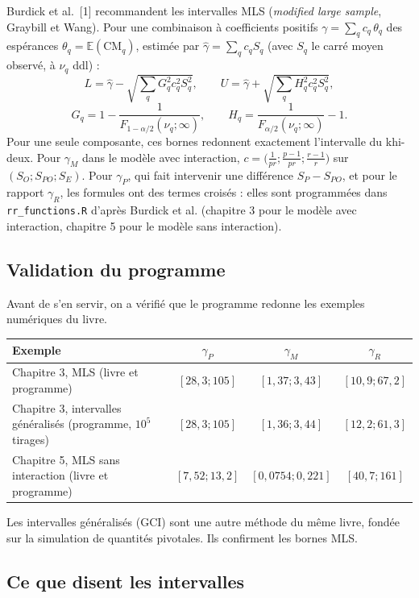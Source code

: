 \documentclass[11pt,a4paper]{article}
\theoremstyle{sj}
\theoremstyle{definition}
\theoremstyle{remark}
\newcommand{\E}{\mathbb{E}}
\newcommand{\CM}{\mathrm{CM}}
\newcommand{\gP}{\gamma_P}
\newcommand{\gM}{\gamma_M}
\newcommand{\gR}{\gamma_R}
\begin{document}
Burdick et al.~[1] recommandent les intervalles MLS (\emph{modified large sample}, Graybill et Wang). Pour une combinaison à coefficients positifs $\gamma=\sum_q c_q\,\theta_q$ des espérances $\theta_q=\E(\CM_q)$, estimée par $\hat\gamma=\sum_qc_qS_q$ (avec $S_q$ le carré moyen observé, à $\nu_q$ ddl) :
\[
L=\hat\gamma-\sqrt{\textstyle\sum_q G_q^2c_q^2S_q^2},\qquad U=\hat\gamma+\sqrt{\textstyle\sum_q H_q^2c_q^2S_q^2},
\]
\[
G_q=1-\frac{1}{F_{1-\alpha/2}(\nu_q;\infty)},\qquad H_q=\frac{1}{F_{\alpha/2}(\nu_q;\infty)}-1.
\]
Pour une seule composante, ces bornes redonnent exactement l'intervalle du khi-deux. Pour $\gM$ dans le modèle avec interaction, $c=\big(\tfrac{1}{pr};\tfrac{p-1}{pr};\tfrac{r-1}{r}\big)$ sur $(S_O;S_{PO};S_E)$. Pour $\gP$, qui fait intervenir une différence $S_P-S_{PO}$, et pour le rapport $\gR$, les formules ont des termes croisés : elles sont programmées dans \texttt{rr\_functions.R} d'après Burdick et al. (chapitre 3 pour le modèle avec interaction, chapitre 5 pour le modèle sans interaction).

\subsection{Validation du programme}

Avant de s'en servir, on a vérifié que le programme redonne les exemples numériques du livre.
\begin{center}
\small
\begin{tabular}{p{5.6cm} c c c}
\toprule
Exemple & $\gP$ & $\gM$ & $\gR$\\
\midrule
Chapitre 3, MLS (livre et programme) & $[28{,}3;105]$ & $[1{,}37;3{,}43]$ & $[10{,}9;67{,}2]$\\
Chapitre 3, intervalles généralisés (programme, $10^5$ tirages) & $[28{,}3;105]$ & $[1{,}36;3{,}44]$ & $[12{,}2;61{,}3]$\\
Chapitre 5, MLS sans interaction (livre et programme) & $[7{,}52;13{,}2]$ & $[0{,}0754;0{,}221]$ & $[40{,}7;161]$\\
\bottomrule
\end{tabular}
\end{center}
Les intervalles généralisés (GCI) sont une autre méthode du même livre, fondée sur la simulation de quantités pivotales. Ils confirment les bornes MLS.

\subsection{Ce que disent les intervalles}
\end{document}
